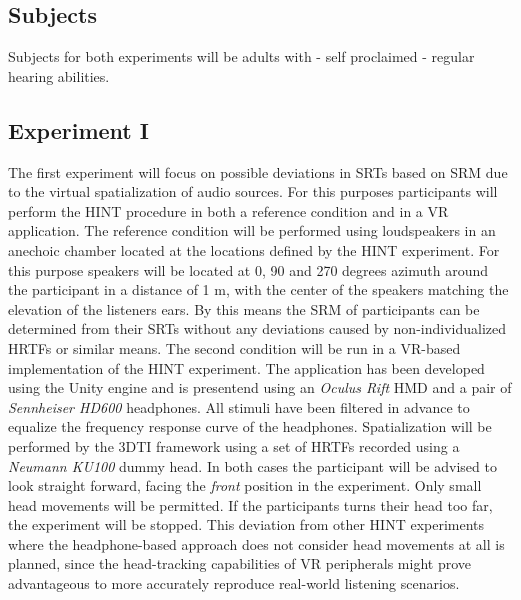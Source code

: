 \documentclass[a4paper,11pt]{article}%
\renewcommand{\\}{\vspace*{0.5\baselineskip} \newline}
\begin{document}
\subsection{Subjects}
Subjects for both experiments will be adults with - self proclaimed - regular hearing abilities.

\subsection{Experiment I}
The first experiment will focus on possible deviations in \ac{SRT}s based on \ac{SRM} due to the virtual spatialization of audio sources. For this purposes participants will perform the \ac{HINT} procedure in both a reference condition and in a \ac{VR} application. The reference condition will be performed using loudspeakers in an anechoic chamber located at the locations defined by the \ac{HINT} experiment. For this purpose speakers will be located at 0, 90 and 270 degrees azimuth around the participant in a distance of 1 m, with the center of the speakers matching the elevation of the listeners ears. By this means the \ac{SRM} of participants can be determined from their \ac{SRT}s without any deviations caused by non-individualized \ac{HRTF}s or similar means. 
\newline
\newline
The second condition will be run in a \ac{VR}-based implementation of the \ac{HINT} experiment. The application has been developed using the Unity engine and is presentend using an \textit{Oculus Rift} \ac{HMD} and a pair of \textit{Sennheiser HD600} headphones. All stimuli have been filtered in advance to equalize the frequency response curve of the headphones. Spatialization will be performed by the \ac{3DTI} framework using a set of \ac{HRTF}s recorded using a \textit{Neumann KU100} dummy head.
\newline
\newline
In both cases the participant will be advised to look straight forward, facing the \textit{front} position in the experiment. Only small head movements will be permitted. If the participants turns their head too far, the experiment will be stopped. This deviation from other \ac{HINT} experiments where the headphone-based approach does not consider head movements at all is planned, since the head-tracking capabilities of \ac{VR} peripherals might prove advantageous to more accurately reproduce real-world listening scenarios.
\newline
\newline
\end{document}
